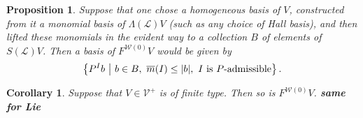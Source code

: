 \documentclass[11pt]{amsart}
\theoremstyle{plain}
\newtheorem{prop}[thm]{Proposition}
\newtheorem{cor}[thm]{Corollary}
\theoremstyle{definition}
\renewcommand{\to}{\longrightarrow}
\newcommand{\scrL}{\mathscr{L}}
\newcommand{\scrC}{\mathscr{C}}
\newcommand{\calP}{\mathcal{P}}
\newcommand{\calV}{\mathcal{V}}
\newcommand{\calw}{\mathcal{W}}
\theoremstyle{plain}
\newcommand{\Palg}{{\calP}}
\newcommand{\LieOperad}{{\scrL}}
\newcommand{\vect}[2]{\calV^{#1}_{#2}}
\newcommand{\minDimP}{\overline{m}}
\newcommand{\algs}{{\scrC\!\textit{om}}}
\begin{document}
\begin{Constructing (co)homotopy operations}
\begin{prop}
Suppose that one chose a homogeneous basis of $V$, constructed from it a monomial  basis of $\Lambda(\LieOperad)V$ (such as any choice of Hall basis), and then lifted these monomials in the evident way to a collection $B$ of elements of $S(\LieOperad)V$. Then a basis of $F^{\calw(0)}V$ would be given by
\[\left\{P^Ib\ \middle|\ b\in B,\ \minDimP(I)\leq|b|,\ \textup{$I$ is $P$-admissible}\right\}.\]
\end{prop}
\begin{cor}\label{finite type pres by FW0}
Suppose that $V\in\vect{+}{}$ is of finite type. Then so is $F^{\calw(0)}V$. \textbf{same for Lie}
\end{cor}
%
%
%
%
%
%
%

\end{Constructing (co)homotopy operations}
\end{document}
